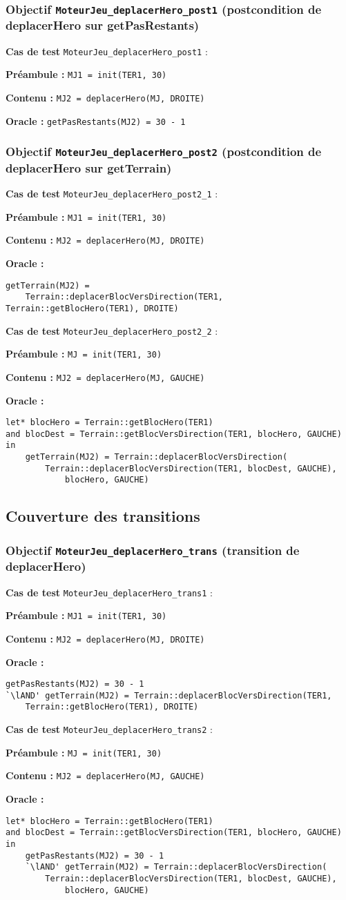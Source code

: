 \documentclass{article}
\newcommand{\cmd}[1]{\texttt{#1}}
\newcommand{\lAND}{$\land$}
\newcommand{\obj}[2]{\subsubsection*{\large{\textbf{Objectif {\cmd{#1} (#2)}}}}}
\newenvironment{cas}[1]
{
	\hspace{1em}\textbf{Cas de test} \cmd{#1} :
	\begin{list}{}{}
}{
	\end{list}\vspace{1em}
}
\newcommand{\pre}[1]{\item \textbf{Préambule :} \cmd{#1}}
\newcommand{\ope}[1]{\item \textbf{Contenu :} \cmd{#1}}
\newcommand{\ora}[1]{\item \textbf{Oracle :} \cmd{#1}}
\newcommand{\oram}{\item \textbf{Oracle :}}
\begin{document}
\obj{MoteurJeu\_deplacerHero\_post1} {postcondition de deplacerHero sur getPasRestants}
	\begin{cas} {MoteurJeu\_deplacerHero\_post1}
		\pre{MJ1 = init(TER1, 30)}
		\ope{MJ2 = deplacerHero(MJ, DROITE)}
		\ora{getPasRestants(MJ2) = 30 - 1}
	\end{cas}

\obj{MoteurJeu\_deplacerHero\_post2} {postcondition de deplacerHero sur getTerrain}
	\begin{cas} {MoteurJeu\_deplacerHero\_post2\_1}
		\pre{MJ1 = init(TER1, 30)}
		\ope{MJ2 = deplacerHero(MJ, DROITE)}
		\oram{}
		\begin{lstlisting}
getTerrain(MJ2) =
	Terrain::deplacerBlocVersDirection(TER1, Terrain::getBlocHero(TER1), DROITE)
		\end{lstlisting}
	\end{cas}

	\begin{cas} {MoteurJeu\_deplacerHero\_post2\_2}
		\pre{MJ = init(TER1, 30)}
		\ope{MJ2 = deplacerHero(MJ, GAUCHE)}
		\oram{}
		\begin{lstlisting}
let* blocHero = Terrain::getBlocHero(TER1)
and blocDest = Terrain::getBlocVersDirection(TER1, blocHero, GAUCHE)
in
	getTerrain(MJ2) = Terrain::deplacerBlocVersDirection(
		Terrain::deplacerBlocVersDirection(TER1, blocDest, GAUCHE),
			blocHero, GAUCHE)
		\end{lstlisting}
	\end{cas}


\subsection*{Couverture des transitions}

\obj{MoteurJeu\_deplacerHero\_trans} {transition de deplacerHero}
	\begin{cas} {MoteurJeu\_deplacerHero\_trans1}
		\pre{MJ1 = init(TER1, 30)}
		\ope{MJ2 = deplacerHero(MJ, DROITE)}
		\oram{}
		\begin{lstlisting}
getPasRestants(MJ2) = 30 - 1
`\lAND' getTerrain(MJ2) = Terrain::deplacerBlocVersDirection(TER1,
	Terrain::getBlocHero(TER1), DROITE)
		\end{lstlisting}
	\end{cas}

	\begin{cas} {MoteurJeu\_deplacerHero\_trans2}
		\pre{MJ = init(TER1, 30)}
		\ope{MJ2 = deplacerHero(MJ, GAUCHE)}
		\oram{}
		\begin{lstlisting}
let* blocHero = Terrain::getBlocHero(TER1)
and blocDest = Terrain::getBlocVersDirection(TER1, blocHero, GAUCHE)
in
	getPasRestants(MJ2) = 30 - 1
	`\lAND' getTerrain(MJ2) = Terrain::deplacerBlocVersDirection(
		Terrain::deplacerBlocVersDirection(TER1, blocDest, GAUCHE),
			blocHero, GAUCHE)
		\end{lstlisting}
	\end{cas}
\end{document}
